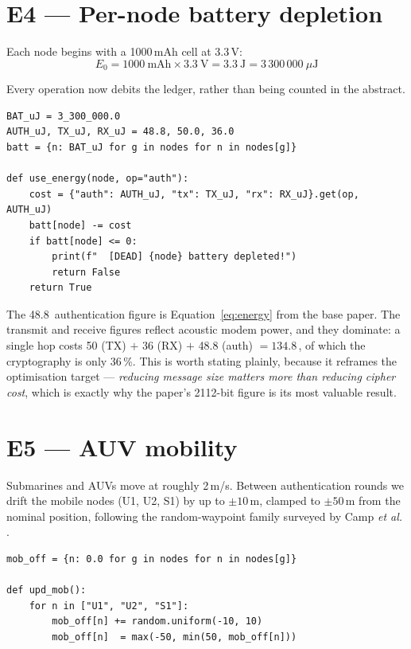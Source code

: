 \section{E4 --- Per-node battery depletion}

Each node begins with a 1000\,mAh cell at 3.3\,V:
\begin{equation}
E_0 = 1000\ \mathrm{mAh} \times 3.3\ \mathrm{V} = 3.3\ \mathrm{J} = 3\,300\,000\ \mu\mathrm{J}
\end{equation}

Every operation now debits the ledger, rather than being counted in the abstract.

\begin{lstlisting}[style=py,caption={Energy accounting (lines 135--145).}]
BAT_uJ = 3_300_000.0
AUTH_uJ, TX_uJ, RX_uJ = 48.8, 50.0, 36.0
batt = {n: BAT_uJ for g in nodes for n in nodes[g]}

def use_energy(node, op="auth"):
    cost = {"auth": AUTH_uJ, "tx": TX_uJ, "rx": RX_uJ}.get(op, AUTH_uJ)
    batt[node] -= cost
    if batt[node] <= 0:
        print(f"  [DEAD] {node} battery depleted!")
        return False
    return True
\end{lstlisting}

The 48.8\,\uJ{} authentication figure is Equation~\ref{eq:energy} from the base paper. The
transmit and receive figures reflect acoustic modem power, and they dominate: a single hop
costs 50 (TX) $+$ 36 (RX) $+$ 48.8 (auth) $= 134.8$\,\uJ, of which the cryptography is only
36\,\%. This is worth stating plainly, because it reframes the optimisation target ---
\emph{reducing message size matters more than reducing cipher cost}, which is exactly why
the paper's 2112-bit figure is its most valuable result.

\section{E5 --- AUV mobility}

Submarines and AUVs move at roughly 2\,m/s. Between authentication rounds we drift the
mobile nodes (U1, U2, S1) by up to $\pm10$\,m, clamped to $\pm50$\,m from the nominal
position, following the random-waypoint family surveyed by Camp \emph{et al.}
\cite{camp}.

\begin{lstlisting}[style=py,caption={Mobility update (lines 163--168).}]
mob_off = {n: 0.0 for g in nodes for n in nodes[g]}

def upd_mob():
    for n in ["U1", "U2", "S1"]:
        mob_off[n] += random.uniform(-10, 10)
        mob_off[n]  = max(-50, min(50, mob_off[n]))
\end{lstlisting}

